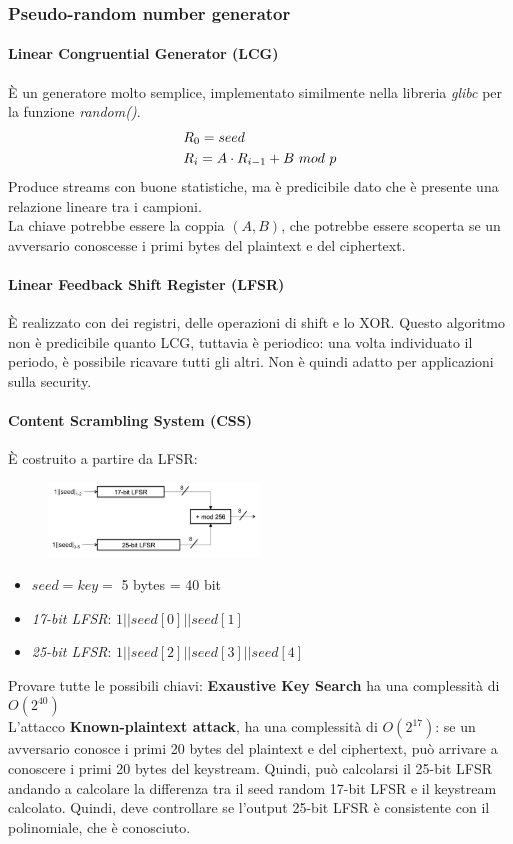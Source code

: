 \documentclass[a4paper,12pt]{article}
\begin{document}
\subsubsection{Pseudo-random number generator}
\paragraph{Linear Congruential Generator (LCG)}
È un generatore molto semplice, implementato similmente nella libreria \textit{glibc} per la funzione \textit{random()}.
\begin{align}
& R_0 = seed \notag \\
& R_i = A \cdot R_{i-1} + B\ mod\ p \notag
\end{align}
Produce streams con buone statistiche, ma è predicibile dato che è presente una relazione lineare tra i campioni. \\
La chiave potrebbe essere la coppia $(A,B)$, che potrebbe essere scoperta se un avversario conoscesse i primi bytes del plaintext e del ciphertext.

\paragraph{Linear Feedback Shift Register (LFSR)}
È realizzato con dei registri, delle operazioni di shift e lo XOR. Questo algoritmo non è predicibile quanto LCG, tuttavia è periodico: una volta individuato il periodo, è possibile ricavare tutti gli altri.
Non è quindi adatto per applicazioni sulla security.

\paragraph{Content Scrambling System (CSS)}
È costruito a partire da LFSR:
\begin{figure}[H]
  \centering
  \includegraphics[width=0.5\textwidth]{img/css}
\end{figure}
\begin{itemize}
	\item $seed = key =$ 5 bytes = 40 bit 
	\item \textit{17-bit LFSR}: $1||seed[0]||seed[1]$
	\item \textit{25-bit LFSR}: $1||seed[2]||seed[3]||seed[4]$
\end{itemize}
Provare tutte le possibili chiavi: \textbf{Exaustive Key Search} ha una complessità di $O(2^{40})$ \\
L'attacco \textbf{Known-plaintext attack}, ha una complessità di $O(2^{17})$: se un avversario conosce i primi 20 bytes del plaintext e del ciphertext, può arrivare a conoscere i primi 20 bytes del keystream. Quindi, può calcolarsi il 25-bit LFSR andando a calcolare la differenza tra il seed random 17-bit LFSR e il keystream calcolato. Quindi, deve controllare se l'output 25-bit LFSR è consistente con il polinomiale, che è conosciuto.
\end{document}
